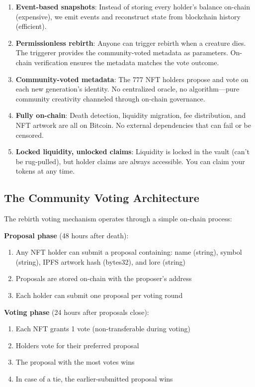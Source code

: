 \documentclass[11pt,a4paper]{article}
\begin{document}
\begin{enumerate}
    \item \textbf{Event-based snapshots}: Instead of storing every holder's balance on-chain (expensive), we emit events and reconstruct state from blockchain history (efficient).

    \item \textbf{Permissionless rebirth}: Anyone can trigger rebirth when a creature dies. The triggerer provides the community-voted metadata as parameters. On-chain verification ensures the metadata matches the vote outcome.

    \item \textbf{Community-voted metadata}: The 777 NFT holders propose and vote on each new generation's identity. No centralized oracle, no algorithm---pure community creativity channeled through on-chain governance.

    \item \textbf{Fully on-chain}: Death detection, liquidity migration, fee distribution, and NFT artwork are all on Bitcoin. No external dependencies that can fail or be censored.

    \item \textbf{Locked liquidity, unlocked claims}: Liquidity is locked in the vault (can't be rug-pulled), but holder claims are always accessible. You can claim your tokens at any time.
\end{enumerate}

\subsection{The Community Voting Architecture}

The rebirth voting mechanism operates through a simple on-chain process:

\textbf{Proposal phase} (48 hours after death):
\begin{enumerate}
    \item Any NFT holder can submit a proposal containing: name (string), symbol (string), IPFS artwork hash (bytes32), and lore (string)
    \item Proposals are stored on-chain with the proposer's address
    \item Each holder can submit one proposal per voting round
\end{enumerate}

\textbf{Voting phase} (24 hours after proposals close):
\begin{enumerate}
    \item Each NFT grants 1 vote (non-transferable during voting)
    \item Holders vote for their preferred proposal
    \item The proposal with the most votes wins
    \item In case of a tie, the earlier-submitted proposal wins
\end{enumerate}
\end{document}
